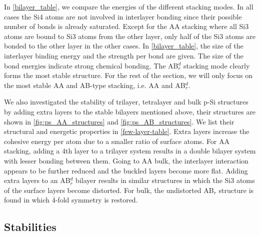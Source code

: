 In \autoref{bilayer_table}, we compare the energies of the different stacking modes. In all cases the Si4 atoms are not involved in interlayer bonding since their possible number of bonds is already saturated.  Except for the AA stacking where all Si3 atoms are bound to Si3 atoms from the other layer, only half of the Si3 atoms are bonded to the other layer in the other cases. In \autoref{bilayer_table}, the size of the interlayer binding energy and the strength per bond are given. The size of the bond energies indicate strong chemical bonding. The  AB$_r^d$ stacking mode clearly forms the most stable structure. For the rest of the section, we will only focus on the most stable AA and AB-type stacking, i.e. AA and AB$_r^d$.

We also investigated the stability of trilayer, tetralayer and bulk p-Si structures by adding extra layers to the stable bilayers mentioned above, their structures are shown in \autoref{fig:ps_AA_structures} and \autoref{fig:ps_AB_structures}. We list their structural and energetic properties in \autoref{few-layer-table}. Extra layers increase the cohesive energy per atom due to a smaller ratio of surface atoms. For AA stacking, adding a 4th layer to a trilayer system results in a double bilayer system with lesser bonding between them. Going to AA bulk, the interlayer interaction appears to be further reduced and the buckled layers become more flat. Adding extra layers to an AB$_r^d$ bilayer results in similar structures in which the Si3 atoms of the surface layers become distorted. For bulk, the undistorted AB$_r$ structure is found in which $\overline{4}$-fold symmetry is restored.



\subsection{Stabilities}\label{stab}

